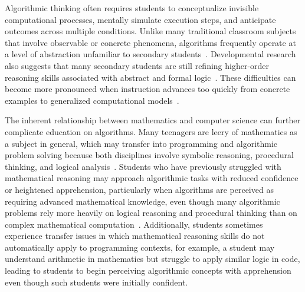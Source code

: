 Algorithmic thinking often requires students to conceptualize invisible computational processes, mentally simulate execution steps, and anticipate
  outcomes across multiple conditions.
Unlike many traditional classroom subjects that involve observable or concrete phenomena, algorithms frequently operate at a level of abstraction
  unfamiliar to secondary students~\cite{chen2009teaching,futschek2006algorithmic,bell2014presenting}.
Developmental research also suggests that many secondary students are still refining higher-order reasoning skills associated with abstract and
  formal logic~\cite{fitrianna2025adolescent}.
These difficulties can become more pronounced when instruction advances too quickly from concrete examples to generalized computational
  models~\cite{grover2017assessing}.

The inherent relationship between mathematics and computer science can further complicate education on algorithms.
Many teenagers are leery of mathematics as a subject in general, which may transfer into programming and algorithmic problem solving because both
  disciplines involve symbolic reasoning, procedural thinking, and logical analysis~\cite{khoche12024mathematical}.
Students who have previously struggled with mathematical reasoning may approach algorithmic tasks with reduced confidence or heightened apprehension,
  particularly when algorithms are perceived as requiring advanced mathematical knowledge, even though many algorithmic problems rely more heavily on
  logical reasoning and procedural thinking than on complex mathematical computation~\cite{Voog2012,grover2017assessing}.
Additionally, students sometimes experience transfer issues in which mathematical reasoning skills do not automatically apply to programming
  contexts, for example, a student may understand arithmetic in mathematics but struggle to apply similar logic in code, leading to students to begin perceiving algorithmic concepts with apprehension even though such students were initially confident.

% 
